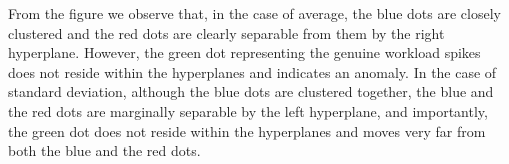 From the figure we observe that, in the case of average, the blue dots are closely clustered and the red dots are clearly separable from them by the right hyperplane. However, the green dot representing the genuine workload spikes does not reside within the hyperplanes and indicates an anomaly.
In the case of standard deviation, although the blue dots are clustered together, the blue and the red dots are marginally separable by the left hyperplane, and importantly, the green dot does not reside within the hyperplanes and moves very far from both the blue and the red dots.
